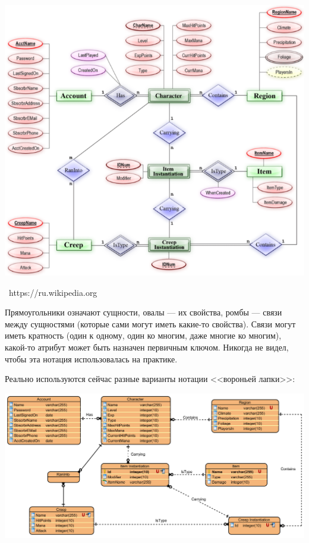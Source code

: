 \documentclass[a5paper]{article}
\newcommand{\attribution}[1] {
	\vspace{-5mm}\begin{flushright}\begin{scriptsize}%
	{\textcopyright\, #1}\end{scriptsize}\end{flushright}
}
\begin{document}
\begin{center}
	\includegraphics[width=\textwidth]{erChenNotation.png}
	\attribution{https://ru.wikipedia.org}
\end{center}

Прямоугольники означают сущности, овалы --- их свойства, ромбы --- связи между сущностями (которые сами могут иметь какие-то свойства). Связи могут иметь кратность (один к одному, один ко многим, даже многие ко многим), какой-то атрибут может быть назначен первичным ключом. Никогда не видел, чтобы эта нотация использовалась на практике.

Реально используются сейчас разные варианты нотации <<вороньей лапки>>:

\begin{center}
	\includegraphics[width=\textwidth]{erCrowsFoot.png}
\end{center}
\end{document}
